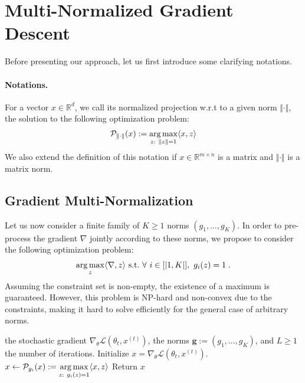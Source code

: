 \section{Multi-Normalized Gradient Descent} \label{sec: mngd}
Before presenting our approach, let us first introduce some clarifying notations.

\paragraph{Notations.} For a vector $x\in\mathbb{R}^d$, we call its normalized projection w.r.t to a given norm $\Vert \cdot\Vert$, the solution to the following optimization problem:
\begin{align}
\label{eq-single-proj}
\mathcal{P}_{\Vert \cdot \Vert}(x):=\operatorname*{arg\,max}_{z:~\Vert z \Vert = 1} \langle x, z\rangle    
\end{align}
We also extend the definition of this notation if $x\in\mathbb{R}^{m\times n}$ is a matrix and $\Vert \cdot \Vert$ is a matrix norm. 


\subsection{Gradient Multi-Normalization}

Let us now consider a finite family of $K\geq 1$ norms $(g_1,\dots,g_K)$. In order to pre-process the gradient $\nabla$ jointly according to these norms, we propose to consider the following optimization problem:
\begin{align}
\label{eq:multi-norm-opt}
 \operatorname*{arg\,max}_{z} \langle \nabla, z\rangle~ \text{s.t.}~\forall~i\in [|1,K|],~g_i(z)=1\; .
\end{align}
Assuming the constraint set is non-empty, the existence of a maximum is guaranteed. However, this problem is NP-hard and non-convex due to the constraints, making it hard to solve efficiently for the general case of arbitrary norms.


\begin{algorithm}[!t]
   \caption{$\texttt{MultiNorm}(\nabla,L, \bm{g})$}
   \label{alg:alt-proj}
\begin{algorithmic}
    the stochastic gradient $\nabla_\theta\mathcal{L}(\theta_t,x^{(t)})$, the norms $\bm{g}:=(g_1,\dots,g_K)$, and $L\geq 1$ the number of iterations.
   \STATE Initialize $x=\nabla_\theta\mathcal{L}(\theta_t,x^{(t)})$.
   \STATE $x\gets \mathcal{P}_{g_i}(x):=\operatorname*{arg\,max}\limits_{z:~g_i(z) = 1} \langle x, z\rangle $
   \ENDFOR
    \ENDFOR
    \STATE Return $x$
\end{algorithmic}
\end{algorithm}

